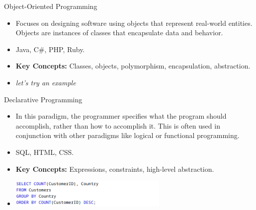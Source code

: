 \documentclass{beamer}
\begin{document}
\begin{frame}{Object-Oriented Programming}
	\scriptsize
	\begin{itemize}
		\item<1-> Focuses on designing software using objects that represent real-world entities. Objects are instances of classes that encapsulate data and behavior.
		\item<2-> Java, C\#, PHP, Ruby.
		\item<3-> \textbf{Key Concepts:}  Classes, objects, polymorphism, encapsulation, abstraction.
		\item<4-> \textit{let's try an example}
	\end{itemize}
\end{frame}

\begin{frame}[t]{Declarative Programming}
	\scriptsize
	\begin{itemize}
		\item<1-> In this paradigm, the programmer specifies what the program should accomplish, rather than how to accomplish it. This is often used in conjunction with other paradigms like logical or functional programming.
		\item<2-> SQL, HTML, CSS.
		\item<3-> \textbf{Key Concepts:} Expressions, constraints, high-level abstraction.
		\item<4->[]
			\vspace{4mm}
			\begin{center}
				\includegraphics[width=0.6\textwidth, height=0.2\textheight]{img/sql-example.png}
			\end{center}
	\end{itemize}
\end{frame}
\end{document}
